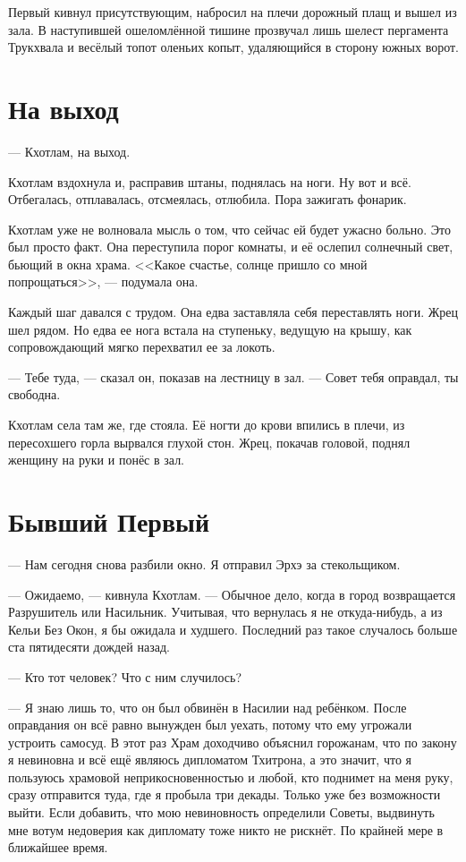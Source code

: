 Первый кивнул присутствующим, набросил на плечи дорожный плащ и вышел из зала.
В наступившей ошеломлённой тишине прозвучал лишь шелест пергамента Трукхвала и весёлый топот оленьих копыт, удаляющийся в сторону южных ворот.

\section{На выход}

--- Кхотлам, на выход.

Кхотлам вздохнула и, расправив штаны, поднялась на ноги.
Ну вот и всё.
Отбегалась, отплавалась, отсмеялась, отлюбила.
Пора зажигать фонарик.

Кхотлам уже не волновала мысль о том, что сейчас ей будет ужасно больно.
Это был просто факт.
Она переступила порог комнаты, и её ослепил солнечный свет, бьющий в окна храма.
<<Какое счастье, солнце пришло со мной попрощаться>>, --- подумала она.

Каждый шаг давался с трудом.
Она едва заставляла себя переставлять ноги.
Жрец шел рядом.
Но едва ее нога встала на ступеньку, ведущую на крышу, как сопровождающий мягко перехватил ее за локоть.

--- Тебе туда, --- сказал он, показав на лестницу в зал.
--- Совет тебя оправдал, ты свободна.

Кхотлам села там же, где стояла.
Её ногти до крови впились в плечи, из пересохшего горла вырвался глухой стон.
Жрец, покачав головой, поднял женщину на руки и понёс в зал.

\section{Бывший Первый}

--- Нам сегодня снова разбили окно.
Я отправил Эрхэ за стекольщиком.

--- Ожидаемо, --- кивнула Кхотлам.
--- Обычное дело, когда в город возвращается Разрушитель или Насильник.
Учитывая, что вернулась я не откуда-нибудь, а из Кельи Без Окон, я бы ожидала и худшего.
Последний раз такое случалось больше ста пятидесяти дождей назад.

--- Кто тот человек?
Что с ним случилось?

--- Я знаю лишь то, что он был обвинён в Насилии над ребёнком.
После оправдания он всё равно вынужден был уехать, потому что ему угрожали устроить самосуд.
В этот раз Храм доходчиво объяснил горожанам, что по закону я невиновна и всё ещё являюсь дипломатом Тхитрона, а это значит, что я пользуюсь храмовой неприкосновенностью и любой, кто поднимет на меня руку, сразу отправится туда, где я пробыла три декады.
Только уже без возможности выйти.
Если добавить, что мою невиновность определили Советы, выдвинуть мне вотум недоверия как дипломату тоже никто не рискнёт.
По крайней мере в ближайшее время.

